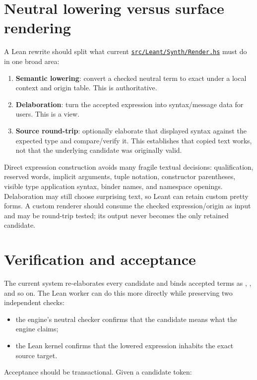 \documentclass[10pt,letterpaper,oneside]{report}
\newcommand{\code}[1]{\texttt{\detokenize{#1}}}
\newcommand{\term}[1]{\textbf{#1}}
\def\LeantBase{https://github.com/VladimirReshetnikov/Leant/blob/89663ab01d24f61bc017b8c8b1f52c35573082e4/}
\newcommand{\lpath}[1]{\href{\LeantBase#1}{\nolinkurl{#1}}}
\begin{document}
\section{Neutral lowering versus surface rendering}

A Lean rewrite should split what current \lpath{src/Leant/Synth/Render.hs} must do in one broad area:

\begin{enumerate}
  \item \term{Semantic lowering}: convert a checked neutral term to exact \code{Expr} under a local context and origin table. This is authoritative.
  \item \term{Delaboration}: turn the accepted expression into syntax/message data for users. This is a view.
  \item \term{Source round-trip}: optionally elaborate that displayed syntax against the expected type and compare/verify it. This establishes that copied text works, not that the underlying candidate was originally valid.
\end{enumerate}

Direct expression construction avoids many fragile textual decisions: qualification, reserved words, implicit arguments, tuple notation, constructor parentheses, visible type application syntax, binder names, and namespace openings. Delaboration may still choose surprising text, so Leant can retain custom pretty forms. A custom renderer should consume the checked expression/origin as input and may be round-trip tested; its output never becomes the only retained candidate.

\section{Verification and acceptance}

The current system re-elaborates every candidate and binds accepted terms as \code{it1}, \code{it2}, and so on. The Lean worker can do this more directly while preserving two independent checks:

\begin{itemize}
  \item the engine's neutral checker confirms that the candidate means what the engine claims;
  \item the Lean kernel confirms that the lowered expression inhabits the exact source target.
\end{itemize}

Acceptance should be transactional. Given a candidate token:
\end{document}
